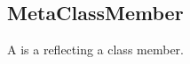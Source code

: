 \subsection{MetaClassMember}
\label{concept-MetaClassMember}

A  is a  reflecting a class member.



